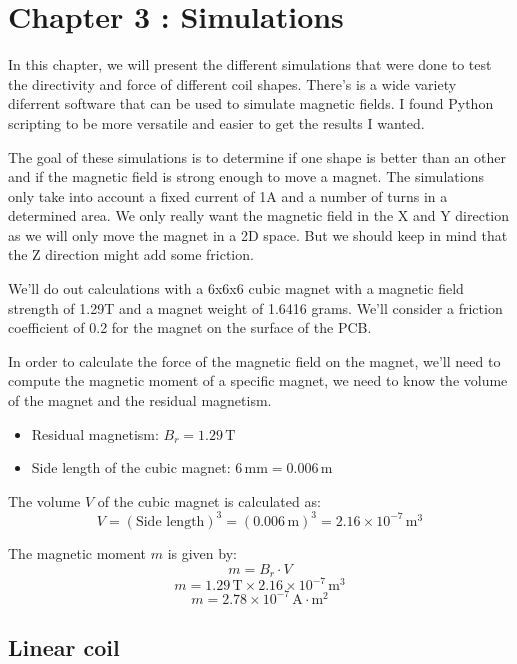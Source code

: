 
\chapter{Chapter 3 : Simulations}

In this chapter, we will present the different simulations that were done to test the directivity and force of different coil shapes. There's is a wide variety diferrent software that can be used to simulate magnetic fields. I found Python scripting to be more versatile and easier to get the results I wanted.

The goal of these simulations is to determine if one shape is better than an other and if the magnetic field is strong enough to move a magnet. The simulations only take into account a fixed current of 1A and a number of turns in a determined area. We only really want the magnetic field in the X and Y direction as we will only move the magnet in a 2D space. But we should keep in mind that the Z direction might add some friction.

We'll do out calculations with a 6x6x6 cubic magnet with a magnetic field strength of 1.29T and a magnet weight of 1.6416 grams. We'll consider a friction coefficient of 0.2 for the magnet on the surface of the PCB.

In order to calculate the force of the magnetic field on the magnet, we'll need to compute the magnetic moment of a specific magnet, we need to know the volume of the magnet and the residual magnetism.

\begin{itemize}
	\item Residual magnetism: \( B_r = 1.29 \, \text{T} \)
	\item Side length of the cubic magnet: \( 6 \, \text{mm} = 0.006 \, \text{m} \)
\end{itemize}

The volume \( V \) of the cubic magnet is calculated as:
\[
	V = (\text{Side length})^3 = (0.006 \, \text{m})^3 = 2.16 \times 10^{-7} \, \text{m}^3
\]

The magnetic moment \( m \) is given by:
\[
	m = B_r \cdot V
\]
\[
	m = 1.29 \, \text{T} \times 2.16 \times 10^{-7} \, \text{m}^3
\]
\[
	m = 2.78 \times 10^{-7} \, \text{A} \cdot \text{m}^2
\]


\section{Linear coil}

